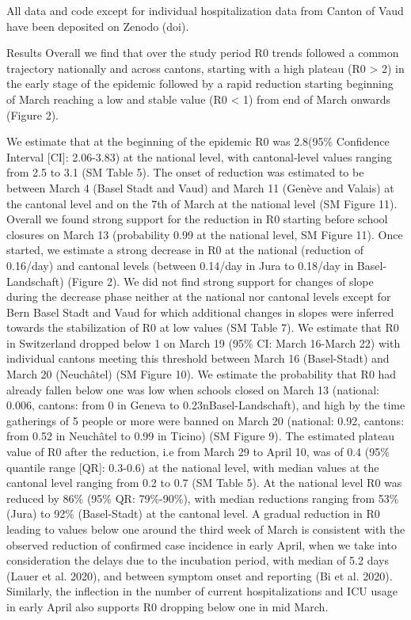 All data and code except for individual hospitalization data from Canton of Vaud have been deposited on Zenodo (doi).


Results
Overall we find that over the study period R0  trends followed a common trajectory nationally and across cantons, starting with a high plateau (R0 > 2) in the early stage of the epidemic followed by a rapid reduction starting beginning of March reaching a low and stable value (R0 < 1) from end of March onwards (Figure 2).

We estimate that at the beginning of the epidemic R0 was 2.8(95\% Confidence Interval [CI]: 2.06-3.83) at the national level, with cantonal-level values ranging from 2.5 to 3.1 (SM Table 5). The onset of reduction was estimated to be between March 4 (Basel Stadt and Vaud) and March 11 (Genève and Valais) at the cantonal level and on the 7th of March at the national level (SM Figure 11). Overall we found strong support for the reduction in R0 starting before school closures on March 13 (probability 0.99 at the national level, SM Figure 11). Once started, we estimate a strong decrease in R0 at the national (reduction of 0.16/day) and cantonal levels (between 0.14/day in Jura to 0.18/day in Basel-Landschaft) (Figure 2). We did not find strong support for changes of slope during the decrease phase neither at the national nor cantonal levels except for Bern Basel Stadt and Vaud for which additional changes in slopes were inferred towards the stabilization of R0 at low values (SM Table 7). We estimate that R0 in Switzerland dropped below 1 on March 19 (95\% CI: March 16-March 22) with individual cantons meeting this threshold between March 16 (Basel-Stadt) and March 20 (Neuchâtel) (SM Figure 10). We estimate the probability that R0 had already fallen below one was low when schools closed on March 13 (national: 0.006, cantons: from 0 in Geneva to 0.23nBasel-Landschaft), and high by the time gatherings of 5 people or more were banned on March 20 (national: 0.92, cantons: from 0.52 in Neuchâtel to 0.99 in Ticino) (SM Figure 9). The estimated plateau value of R0 after the reduction, i.e from March 29 to April 10, was of 0.4 (95\% quantile range [QR]: 0.3-0.6) at the national level, with median values at the cantonal level ranging from 0.2 to 0.7 (SM Table 5). At the national level  R0 was reduced by  86\% (95\% QR: 79\%-90\%), with median reductions ranging from 53\% (Jura) to 92\% (Basel-Stadt) at the cantonal level. A gradual reduction in R0 leading to values below one around the third week of March is consistent with the observed reduction of confirmed case incidence in early April, when we take into consideration the delays due to the incubation period, with median of 5.2 days (Lauer et al. 2020), and between symptom onset and reporting (Bi et al. 2020). Similarly, the inflection in the number of current hospitalizations and ICU usage in early April also supports R0 dropping below one in mid March.  

